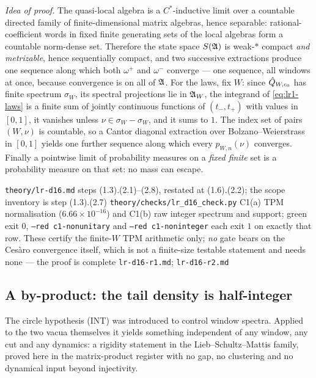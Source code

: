 \emph{Idea of proof.} The quasi-local algebra is a $C^*$-inductive limit over
a countable directed family of finite-dimensional matrix algebras, hence
separable: rational-coefficient words in fixed finite generating sets of the
local algebras form a countable norm-dense set. Therefore the state space
$S(\mathfrak{A})$ is weak-$*$ compact \emph{and metrizable}, hence sequentially
compact, and two successive extractions produce one sequence along which both
$\omega^{+}$ and $\omega^{-}$ converge --- one sequence, all windows at once,
because convergence is on all of $\mathfrak{A}$. For the laws, fix $W$: since
$\hat{Q}_{W,c_0}$ has finite spectrum $\sigma_W$, its spectral projections lie
in $\mathfrak{A}_W$, the integrand of \eqref{eq:lr1-laws} is a finite sum of jointly
continuous functions of $(t_-,t_+)$ with values in $[0,1]$, it vanishes unless
$\nu\in\sigma_W-\sigma_W$, and it sums to $1$. The index set of pairs
$(W,\nu)$ is countable, so a Cantor diagonal extraction over
Bolzano--Weierstrass in $[0,1]$ yields one further sequence along which every
$p_{W,n}(\nu)$ converges. Finally a pointwise limit of probability measures
on a \emph{fixed finite} set is a probability measure on that set: no mass can
escape.

{\texttt{theory/lr-d16.md} steps (1.3).(2.1)--(2.8), restated at (1.6).(2.2);
 the scope inventory is step (1.3).(2.7)}
{\texttt{theory/checks/lr\_d16\_check.py} C1(a) TPM normalisation
 ($6.66\times10^{-16}$) and C1(b) raw integer spectrum and support; green
 exit $0$, \texttt{--red c1-nonunitary} and \texttt{--red c1-noninteger} each
 exit $1$ on exactly that row. These certify the finite-$W$ TPM arithmetic
 only; \emph{no} gate bears on the Cesàro convergence itself, which is not a
 finite-size testable statement and needs none --- the proof is complete}
{\texttt{lr-d16-r1.md}; \texttt{lr-d16-r2.md}}

\subsection{A by-product: the tail density is half-integer}

The circle hypothesis (INT) was introduced to control window spectra. Applied
to the two vacua themselves it yields something independent of any window, any
cut and any dynamics: a rigidity statement in the Lieb--Schultz--Mattis
family, proved here in the matrix-product register with no gap, no clustering
and no dynamical input beyond injectivity.

